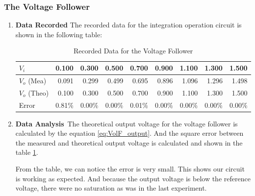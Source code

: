     \subsubsection{The Voltage Follower}
    \begin{enumerate}[I]
        \item \textbf{Data Recorded}\newline
            The recorded data for the integration operation circuit is shown in the following table:
            \begin{table}[H]
                \centering
                \begin{tabular}{l|rrrrrrrr}
                    \toprule
                    $V_i$ & 0.100 & 0.300 & 0.500 & 0.700 & 0.900 & 1.100 & 1.300 & 1.500 \\
                    \midrule
                    $V_o$ (Mea) & 0.091 & 0.299 & 0.499 & 0.695 & 0.896 & 1.096 & 1.296 & 1.498 \\
                    \midrule
                    $V_o$ (Theo) & 0.100 & 0.300 & 0.500 & 0.700 & 0.900 & 1.100 & 1.300 & 1.500 \\
                    Error & 0.81\% & 0.00\% & 0.00\% & 0.01\% & 0.00\% & 0.00\% & 0.00\% & 0.00\% \\
                    \bottomrule
                    \end{tabular}%
                    \caption{Recorded Data for the Voltage Follower}
                    \label{tab:VolFAmp}
            \end{table}
        \item \textbf{Data Analysis}\newline\
            The theoretical output voltage for the voltage follower is calculated by the equation \ref{eq:VolF_output}. And the square error between the measured and theoretical output voltage is calculated and shown in the table \ref{tab:VolFAmp}.\par

            From the table, we can notice the error is very small. This shows our circuit is working as expected. And because the output voltage is below the reference voltage, there were no saturation as was in the last experiment.\par
    \end{enumerate}

